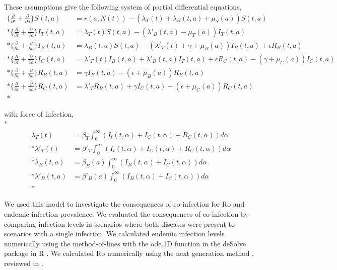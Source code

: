 \documentclass[11pt]{article}
\begin{document}
\noindent
These assumptions give the following system of partial differential equations, \\
\begin{align*}
\Big \{ \frac{\partial}{\partial t} + \frac{\partial}{\partial a} \Big \} S_{}(t, a) &= r(a, N(t)) - (\lambda_{T}(t) + \lambda_{B}(t, a) + \mu_{S}(a)) S(t, a) \\*         
\Big \{ \frac{\partial}{\partial t} + \frac{\partial}{\partial a} \Big \} I_{T}(t, a)&= \lambda_{T}(t) S(t, a) -  (\lambda'_{B}(t, a) - \mu_{T}(a)) I_{T}(t, a) \\*
\Big \{ \frac{\partial}{\partial t} + \frac{\partial}{\partial a} \Big \}  I_{B}(t, a)&=  \lambda_{B}(t, a) S(t, a) - (\lambda'_{T}(t) + \gamma + \mu_{B}(a)) I_{B}(t, a) + \epsilon R_{B}(t, a) \\*
\Big \{ \frac{\partial }{\partial t} + \frac{\partial}{\partial a} \Big \}  I_{C}(t, a)&= \lambda'_{T}(t) I_{B}(t,a) + \lambda'_{B}(t, a) I_{T}(t, a) + \epsilon R_{C}(t, a) - (\gamma + \mu_{C}(a)) I_{C}(t, a) \\*
\Big \{ \frac{\partial}{\partial t} + \frac{\partial}{\partial a} \Big \}  R_{B}(t, a)&=  \gamma I_{B}(t, a) - (\epsilon + \mu_{B}(a)) R_{B}(t, a) \\*            
\Big \{ \frac{\partial}{\partial t} + \frac{\partial}{\partial a} \Big \} R_{C}(t, a)&=  \lambda'_{T} R_{B}(t, a) + \gamma I_{C}(t, a) - (\epsilon + \mu_{C}(a)) R_{C}(t, a) \\* 
\end{align*}

\noindent
with force of infection, \\*
\begin{align*}
\lambda_{T}(t) &= \beta_T \int_{0}^{\infty} (I_t(t,\alpha) + I_{C}(t,\alpha) + R_{C}(t, \alpha)) d\alpha\\*
\lambda'_{T}(t) &= \beta'_T \int_{0}^{\infty} (I_t(t,\alpha) + I_{C}(t,\alpha) + R_{C}(t, \alpha)) d\alpha\\*
\lambda_{B}(t, a) &= \beta_{B}(a) \int_{0}^{\infty} (I_{B}(t,\alpha) + I_{C}(t,\alpha)) d\alpha\\*
\lambda'_{B}(t, a) &= \beta'_{B}(a) \int_{0}^{\infty} (I_{B}(t,\alpha) + I_{C}(t,\alpha)) d\alpha\\*
\end{align*}


We used this model to investigate the consequences of co-infection for Ro and endemic infection prevalence. 
We evaluated the consequences of co-infection by comparing infection levels in scenarios where both diseases were present to scenarios with a single infection.
We calculated endemic infection levels numerically using the method-of-lines with the ode.1D function in the deSolve package in R \cite{desolve_package}.
We calculated Ro numerically using the next generation method \cite{van_den_driessche_reproduction_2002}, reviewed in \cite{heffernan_perspectives_2005}.
\end{document}
